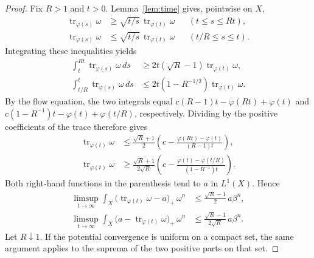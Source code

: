 \documentclass[reqno]{amsart}
\numberwithin{equation}{section}
\theoremstyle{definition}
\DeclareMathOperator{\tr}{tr}
\begin{document}
\begin{proof}
Fix $R>1$ and $t>0$. Lemma~\ref{lem:time} gives, pointwise on $X$,
\[
 \begin{aligned}
 \tr_{\varphi(s)}\omega
 &\ge\sqrt{t/s}\,\tr_{\varphi(t)}\omega
       &&(t\le s\le Rt),\\
 \tr_{\varphi(s)}\omega
 &\le\sqrt{t/s}\,\tr_{\varphi(t)}\omega
       &&(t/R\le s\le t).
 \end{aligned}
\]
Integrating these inequalities yields
\[
 \begin{aligned}
 \int_t^{Rt}\tr_{\varphi(s)}\omega\,ds
 &\ge2t(\sqrt R-1)\tr_{\varphi(t)}\omega,\\
 \int_{t/R}^t\tr_{\varphi(s)}\omega\,ds
 &\le2t(1-R^{-1/2})\tr_{\varphi(t)}\omega.
 \end{aligned}
\]
By the flow equation, the two integrals equal
$c(R-1)t-\varphi(Rt)+\varphi(t)$ and
$c(1-R^{-1})t-\varphi(t)+\varphi(t/R)$, respectively.
Dividing by the positive coefficients of the trace therefore gives
\begin{equation}\label{eq:time-averages}
 \begin{aligned}
 \tr_{\varphi(t)}\omega
 &\le\frac{\sqrt R+1}{2}
   \left(c-\frac{\varphi(Rt)-\varphi(t)}{(R-1)t}\right),\\
 \tr_{\varphi(t)}\omega
 &\ge\frac{\sqrt R+1}{2\sqrt R}
   \left(c-\frac{\varphi(t)-\varphi(t/R)}{(1-R^{-1})t}\right).
 \end{aligned}
\end{equation}
Both right-hand functions in the parenthesis tend to $a$ in $L^1(X)$. Hence
\[
 \begin{aligned}
 \limsup_{t\to\infty}\int_X
   \bigl(\tr_{\varphi(t)}\omega-a\bigr)_+\,\omega^n
 &\le\frac{\sqrt R-1}{2}\,a\beta^n,\\
 \limsup_{t\to\infty}\int_X
   \bigl(a-\tr_{\varphi(t)}\omega\bigr)_+\,\omega^n
 &\le\frac{\sqrt R-1}{2\sqrt R}\,a\beta^n.
 \end{aligned}
\]
Let $R\downarrow1$. If the potential convergence is uniform on a
compact set, the same argument applies to the suprema of the two
positive parts on that set.
\end{proof}
\end{document}
